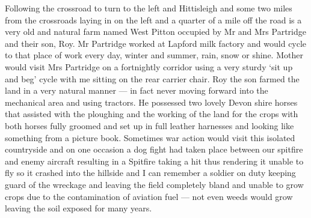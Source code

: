 Following the crossroad to turn to the left and Hittisleigh and some two miles
from the crossroads laying in on the left and a quarter of a mile off the road
is a very old and natural farm named West Pitton occupied by Mr and Mrs
Partridge and their son, Roy. Mr Partridge worked at Lapford milk factory and
would cycle to that place of work every day, winter and summer, rain, snow or
shine. Mother would visit Mrs Partridge on a fortnightly corridor using a very
sturdy ‘sit up and beg' cycle with me sitting on the rear carrier chair. Roy
the son farmed the land in a very natural manner — in fact never moving forward
into the mechanical area and using tractors. He possessed two lovely Devon
shire horses that assisted with the ploughing and the working of the land for
the crops with both horses fully groomed and set up in full leather harnesses
and looking like something from a picture book. Sometimes war action would
visit this isolated countryside and on one occasion a dog fight had taken place
between our spitfire and enemy aircraft resulting in a Spitfire taking a hit
thus rendering it unable to fly so it crashed into the hillside and I can
remember a soldier on duty keeping guard of the wreckage and leaving the field
completely bland and unable to grow crops due to the contamination of aviation
fuel — not even weeds would grow leaving the soil exposed for many years.

